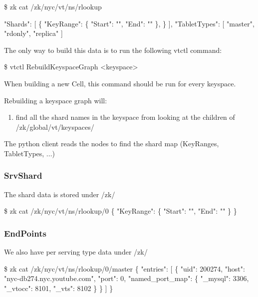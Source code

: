\begin{codesample2}

  \$ zk cat /zk/nyc/vt/ns/rlookup
  
    "Shards": [
      \{
        "KeyRange": \{
          "Start": "",
          "End": ""
        \},
      \}
    ],
    "TabletTypes": [
      "master",
      "rdonly",
      "replica"
    ]
\end{codesample2}

The only way to build this data is to run the following vtctl command:

\begin{codesample2}
\$ vtctl RebuildKeyspaceGraph <keyspace>
\end{codesample2}

When building a new Cell, this command should be run for every keyspace.

Rebuilding a keyspace graph will:

\begin{enumerate}
\item find all the shard names in the keyspace from looking at the children of /zk/global/vt/keyspaces/
\end{enumerate}

The python client reads the nodes to find the shard map (KeyRanges, TabletTypes, ...)

\subsubsection{SrvShard}

The shard data is stored under /zk/

\begin{codesample2}
  \$ zk cat /zk/nyc/vt/ns/rlookup/0
  \{
    "KeyRange": \{
      "Start": "",
      "End": ""
    \}
  \}
\end{codesample2}

\subsubsection{EndPoints}

We also have per serving type data under /zk/

\begin{codesample2}
  \$ zk cat /zk/nyc/vt/ns/rlookup/0/master
  \{
    "entries": [
      \{
        "uid": 200274,
        "host": "nyc-db274.nyc.youtube.com",
        "port": 0,
        "named_port_map": \{
          "_mysql": 3306,
          "_vtocc": 8101,
          "_vts": 8102
        \}
      \}
    ]
  \}
\end{codesample2}

